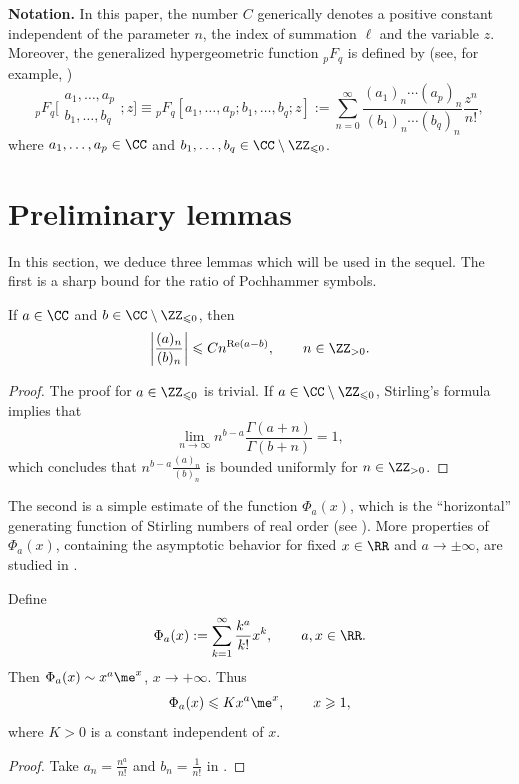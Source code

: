 \textbf{Notation.}
In this paper, the number $C$ generically denotes a positive constant independent of the parameter $n$, the index of summation $\ell$ and the variable $z$. Moreover, the generalized hypergeometric function $_pF_q$ is defined by (see, for example, \cite[p.~404]{NIST-Handbook})
	\begin{equation}\label{pFq definition}
		{}_pF_q\bigg[\begin{matrix}
			a_1,\dots,a_p\\
			b_1,\dots,b_q
		\end{matrix};z\bigg]
		\equiv
		{}_pF_q[
		a_1,\dots,a_p;
		b_1,\dots,b_q;z]
		:=\sum_{n=0}^{\infty}\frac{(a_1)_n\cdots(a_p)_n}{(b_1)_n\cdots(b_q)_n}\frac{z^n}{n!},
	\end{equation}
	where $a_1,\dots,a_p\in\CC$ and $b_1,\dots,b_q\in\CC\setminus\ZZ_{\leqslant 0}$.

\section{Preliminary lemmas}\label{Sect. 2}
In this section, we deduce three lemmas which will be used in the sequel. The first is a sharp bound for the ratio of Pochhammer symbols.
\begin{Lemma}\label{Lemma: ratio of Pochhammer symbol}
	If $a\in\CC$ and $b\in\CC\setminus\ZZ_{\leqslant 0}$, then
	\[\biggl|\frac{(a)_n}{(b)_n}\biggr|\leqslant Cn^{\operatorname{Re}(a-b)},\qquad n\in\ZZ_{>0}.\]
\end{Lemma}
\begin{proof}
	The proof for $a\in\ZZ_{\leqslant 0}$ is trivial. If $a\in\CC\setminus\ZZ_{\leqslant 0}$, Stirling's formula implies that
		\[\lim_{n\to\infty}n^{b-a}\frac{\Gamma(a+n)}{\Gamma(b+n)}=1,\]
		which concludes that $n^{b-a}\frac{(a)_n}{(b)_n}$ is bounded uniformly for $n\in\ZZ_{>0}$.
\end{proof}

The second is a simple estimate of the function $\Phi_a(x)$, which is the ``horizontal'' generating function of Stirling numbers of real order (see \cite[Section~8]{Butzer_Kilbas_Trujillo-2003}). More properties of $\Phi_a(x)$, containing the asymptotic behavior for fixed $x\in\RR$ and $a\to\pm\infty$, are studied in \cite[Section~3.2]{VanGorder-2009}.
\begin{Lemma}\label{Phi_a(x) estimate}
	Define
	\[\Phi_a(x):=\sum_{k=1}^{\infty}\frac{k^a}{k!}x^k,\qquad a,x\in\RR.\]
	Then $\Phi_a(x)\sim x^a\me^x$, $x\to +\infty$. Thus
	\[\Phi_a(x)\leqslant Kx^a\me^x,\qquad x\geqslant 1,\]
	where $K>0$ is a constant independent of $x$.
\end{Lemma}
\begin{proof}
	Take $a_n=\frac{n^a}{n!}$ and $b_n=\frac{1}{n!}$ in \cite[p.~12, Problem~72]{Polya_Szego-vol.2}.
\end{proof}

